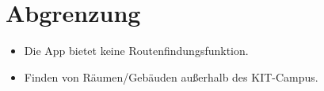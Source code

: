 \section{Abgrenzung}

\begin{itemize}

    \item Die App bietet keine \Gls{Routenfindungsfunktion}. 
    \item Finden von Räumen/Gebäuden außerhalb des \Gls{KIT}-Campus.

\end{itemize}